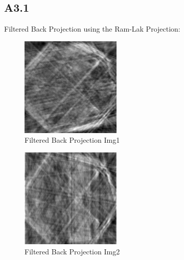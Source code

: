 \documentclass{article}
\begin{document}
\subsection*{A3.1}
Filtered Back Projection using the Ram-Lak Projection:
\begin{figure}[H]
  \centering
  \includegraphics[scale=0.5]{images/fil_b_1}
  \caption{Filtered Back Projection Img1}
  \label{fig:1}
\end{figure}
\begin{figure}[H]
  \centering
  \includegraphics[scale=0.5]{images/fil_b_2}
  \caption{Filtered Back Projection Img2}
  \label{fig:1}
\end{figure}
\end{document}
